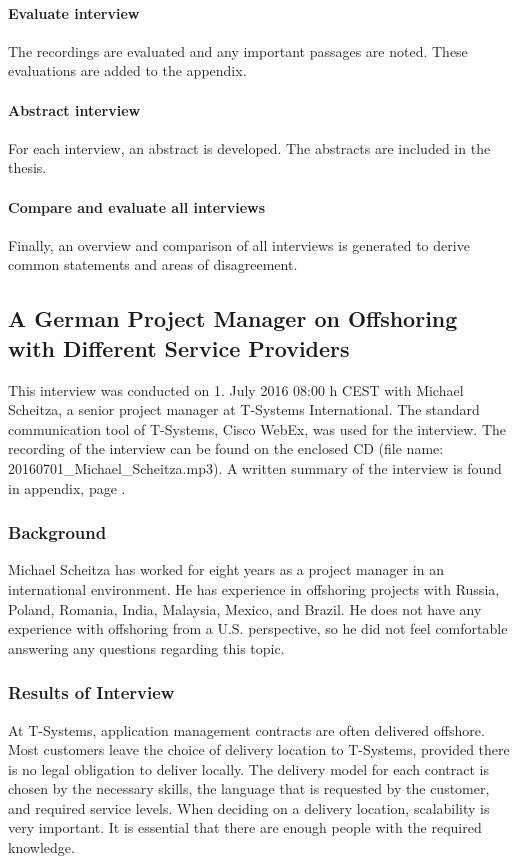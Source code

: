 \paragraph{Evaluate interview} The recordings are evaluated and any important passages are noted. These evaluations are added to the appendix.

\paragraph{Abstract interview} For each interview, an abstract is developed. The abstracts are included in the thesis.

\paragraph{Compare and evaluate all interviews} Finally, an overview and comparison of all interviews is generated to derive common statements and areas of disagreement.

\newpage
\subsection{A German Project Manager on Offshoring with Different Service Providers}

This interview was conducted on 1. July 2016 08:00 h CEST with Michael Scheitza, a senior project manager at T-Systems International. The standard communication tool of T-Systems, Cisco WebEx, was used for the interview. The recording of the interview can be found on the enclosed CD (file name: 20160701\_Michael\_Scheitza.mp3). A written summary of the interview is found in appendix, page \pageref{int:Scheitza}.

\subsubsection{Background}
Michael Scheitza has worked for eight years as a project manager in an international environment. He has experience in offshoring projects with Russia, Poland, Romania, India, Malaysia, Mexico, and Brazil. He does not have any experience with offshoring from a U.S. perspective, so he did not feel comfortable answering any questions regarding this topic. 
\subsubsection{Results of Interview}
At T-Systems, application management contracts are often delivered offshore. Most customers leave the choice of delivery location to T-Systems, provided there is no legal obligation to deliver locally. The delivery model for each contract is chosen by the necessary skills, the language that is requested by the customer, and required service levels. When deciding on a delivery location, scalability is very important. It is essential that there are enough people with the required knowledge.

